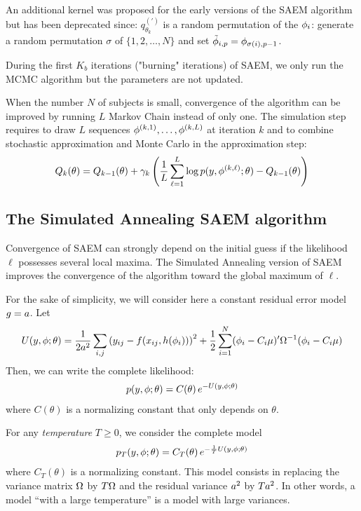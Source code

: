 An additional kernel was proposed for the early versions of the SAEM algorithm but has been deprecated since: $q_{\theta_k}^{(')}$ is a random permutation of the ${\phi}_i$: generate a random permutation $\sigma$ of $\{1,2,\ldots,N\}$ and set $\tilde{{\phi}}_{i,p}={\phi}_{\sigma(i),p-1}$.

 During the first $K_b$ iterations ("burning" iterations) of SAEM, we only run the MCMC algorithm but the parameters are not updated.

  When the number $N$ of subjects is small, convergence of the algorithm can be improved by running $L$ Markov Chain instead of only one. The simulation step requires to draw $L$ sequences $ { {\phi}^{(k,1)}} ,\ldots , { {\phi}^{(k,L)}} $ at iteration $k$ and to combine stochastic approximation and Monte Carlo in the approximation step:
\begin{equation} \label{approx2}
 Q_k(\theta) = Q_{k-1}(\theta) + \gamma_k \left( \frac{1}{L}\sum_{\ell=1}^{L} \log p(y, { {\phi}^{(k,\ell)}} ;\theta) - Q_{k-1}(\theta) \right)
\end{equation}


\subsection{The Simulated Annealing SAEM algorithm}
Convergence of SAEM can strongly depend on the initial guess if the likelihood $\ell$ possesses several local maxima. The Simulated Annealing version of SAEM improves the convergence of the algorithm toward the global maximum of $\ell$.

For the sake of simplicity, we will consider here a constant residual error model $g=a$. Let 
$$ U(\yg,\phig;\theta) = \frac{1}{2\ag^2} \sum_{i,j}\left(y_{ij} - f(x_{ij},h(\phigi)) \right)^2 +\frac{1}{2}\sum_{i=1}^{N}(\phigi-\magi\fixed_effect)^\prime \IIV^{-1}(\phigi-\magi\fixed_effect)$$ 
Then, we can write the complete likelihood:
\begin{eqnarray*}
p(y,{\phi};\theta)  =  C(\theta)\, e^{-U(y,{\phi};\theta)}
\end{eqnarray*}
where $C(\theta)$ is a normalizing constant that only depends on $\theta$.

For any {\it temperature} $T\geq0$, we consider the complete model
\begin{eqnarray*}
p_T(y,{\phi};\theta)  =  C_T(\theta)\, e^{-\frac{1}{T}U(y,{\phi};\theta)}
\end{eqnarray*}
where $C_T(\theta)$ is a normalizing constant. This model consists in replacing the variance matrix ${\Omega}$ by $T{\Omega}$ and the residual variance $a^2$ by $Ta^2$. In other words, a model ``with a large temperature'' is a model with large variances.


